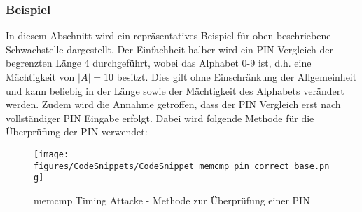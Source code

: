 \documentclass[a4paper,
DIV=13,
12pt,
BCOR=10mm,
department=FakIM,
oneside,
parskip=half,
automark,
listof=totocnumbered,
bibliography=totocnumbered,
acronym=totocnumbered
] {OTHRartcl}
\begin{document}
\subsubsection{Beispiel}
In diesem Abschnitt wird ein repräsentatives Beispiel für oben beschriebene Schwachstelle dargestellt.
Der Einfachheit halber wird ein PIN Vergleich der begrenzten Länge 4 durchgeführt, wobei das Alphabet 0-9 ist, d.h. eine Mächtigkeit von $|A| = 10$ besitzt.
Dies gilt ohne Einschränkung der Allgemeinheit und kann beliebig in der Länge sowie der Mächtigkeit des Alphabets verändert werden.
Zudem wird die Annahme getroffen, dass der PIN Vergleich erst nach vollständiger PIN Eingabe erfolgt. Dabei
wird folgende Methode für die Überprüfung der PIN verwendet:
\begin{figure}[ht!]
  \begin{center}
    \texttt{[image: figures/CodeSnippets/CodeSnippet\_memcmp\_pin\_correct\_base.png]}
    \caption{memcmp Timing Attacke - Methode zur Überprüfung einer PIN}
    \label{fig:memcmpcheckpinbase}
  \end{center}
\end{figure}
\end{document}
